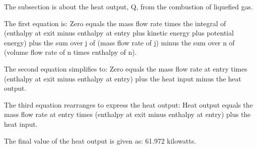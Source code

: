 The subsection is about the heat output, Q, from the combustion of liquefied gas.

The first equation is:
Zero equals the mass flow rate times the integral of (enthalpy at exit minus enthalpy at entry plus kinetic energy plus potential energy) plus the sum over j of (mass flow rate of j) minus the sum over n of (volume flow rate of n times enthalpy of n).

The second equation simplifies to:
Zero equals the mass flow rate at entry times (enthalpy at exit minus enthalpy at entry) plus the heat input minus the heat output.

The third equation rearranges to express the heat output:
Heat output equals the mass flow rate at entry times (enthalpy at exit minus enthalpy at entry) plus the heat input.

The final value of the heat output is given as:
61.972 kilowatts.